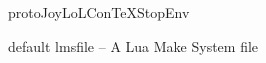 
\startenvironment protoJoyLoLConTeXStopEnv

\createLmsfileFile%
  {default}%
  {lmsfile}%
  {-- A Lua Make System file}

\stopbodymatter

\startbackmatter
  \startchapter[title=Bibliography]
    \placelistofpublications
  \stopchapter
\stopbackmatter

\stopenvironment

